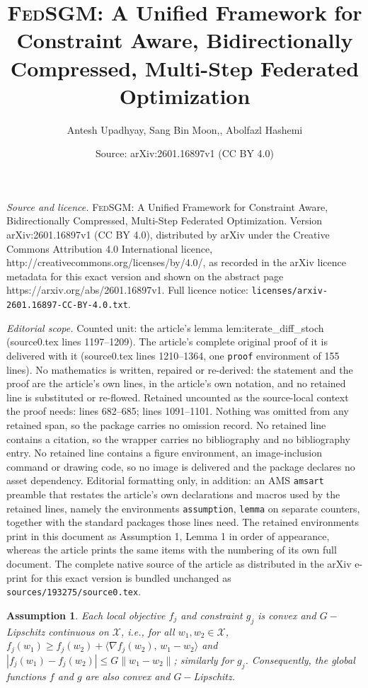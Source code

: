 \documentclass[10pt,a4paper]{amsart}
\title{\textsc{FedSGM}: A Unified Framework for Constraint Aware, Bidirectionally Compressed, Multi-Step Federated Optimization}
\author{Antesh Upadhyay, Sang Bin Moon,, Abolfazl Hashemi}
\date{Source: arXiv:2601.16897v1 (CC BY 4.0)}
\newtheorem{assumption}{Assumption}
\begin{document}
\maketitle

\noindent\emph{Source and licence.} \textsc{FedSGM}: A Unified Framework for Constraint Aware, Bidirectionally Compressed, Multi-Step Federated Optimization. Version arXiv:2601.16897v1 (CC BY 4.0), distributed by arXiv under the Creative Commons Attribution 4.0 International licence, http://creativecommons.org/licenses/by/4.0/, as recorded in the arXiv licence metadata for this exact version and shown on the abstract page https://arxiv.org/abs/2601.16897v1. Full licence notice: \texttt{licenses/arxiv-2601.16897-CC-BY-4.0.txt}.\par\smallskip

\noindent\textit{Editorial scope.} Counted unit: the article's lemma lem:iterate\_diff\_stoch (source0.tex lines 1197--1209). The article's complete original proof of it is delivered with it (source0.tex lines 1210--1364, one \texttt{proof} environment of 155 lines). No mathematics is written, repaired or re-derived: the statement and the proof are the article's own lines, in the article's own notation, and no retained line is substituted or re-flowed.  Retained uncounted as the source-local context the proof needs: lines 682--685; lines 1091--1101.  Nothing was omitted from any retained span, so the package carries no omission record.  No retained line contains a citation, so the wrapper carries no bibliography and no bibliography entry.  No retained line contains a figure environment, an image-inclusion command or drawing code, so no image is delivered and the package declares no asset dependency.  Editorial formatting only, in addition: an AMS \texttt{amsart} preamble that restates the article's own declarations and macros used by the retained lines, namely the environments \texttt{assumption}, \texttt{lemma} on separate counters, together with the standard packages those lines need.  The retained environments print in this document as Assumption 1, Lemma 1 in order of appearance, whereas the article prints the same items with the numbering of its own full document.  The complete native source of the article as distributed in the arXiv e-print for this exact version is bundled unchanged as \texttt{sources/193275/source0.tex}.
\begin{assumption}
\label{as:cvx_lip}
Each local objective $f_j$ and constraint $g_j$ is convex and $G-$Lipschitz continuous on $\mathcal{X}$, i.e., for all $w_1,w_2\in\mathcal{X}$, $f_j(w_1) \ge f_j(w_2) + \langle \nabla f_j(w_2),\, w_1 - w_2 \rangle$ and $|f_j(w_1)-f_j(w_2)|\le G\|w_1-w_2\|$; similarly for $g_j$. Consequently, the global functions $f$ and $g$ are also convex and $G-$Lipschitz.
\end{assumption}
\end{document}
